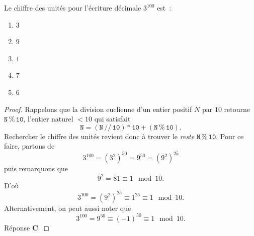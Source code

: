 %
Le chiffre des unités pour l'écriture décimale  $3^{100}$ est~:
\begin{enumerate}
  \item $3$
  \item $9$
  \item $1$
  \item $7$
  \item $6$
\end{enumerate}
%
%
\begin{proof} %
Rappelons que la division euclienne d'un entier positif $N$ par $10$ retourne $\mathtt{N\,\% \, 10}$, l'entier naturel $< 10$ %
qui satisfait 
%
\begin{equation}
  \mathtt{N = (N \, //\, 10 ) \ast 10  +(N \, \% \, 10)}.
\end{equation}
%
Rechercher le chiffre des unités revient donc à trouver le \textit{reste} $\mathtt{N\,\% \, 10}$. Pour ce faire, %
partons de 
%
\begin{equation}
  3^{100} = (3^2)^{50} = 9^{50} =(9^2)^{25}
\end{equation}
%
puis remarquons que 
\begin{equation}
  9^2 = 81 \equiv 1 \mod 10.
\end{equation}
%
D'où
%
\begin{equation}
  3^{100} = (9^2)^{25} \equiv 1^{25} \equiv 1 \mod 10.
\end{equation}
%
Alternativement, on peut aussi noter que 
%
\begin{equation}
  3^{100} = 9^{50} \equiv (\minus 1)^{50} \equiv 1 \mod 10. 
\end{equation}
%
Réponse \textbf{C}.
%
\end{proof}